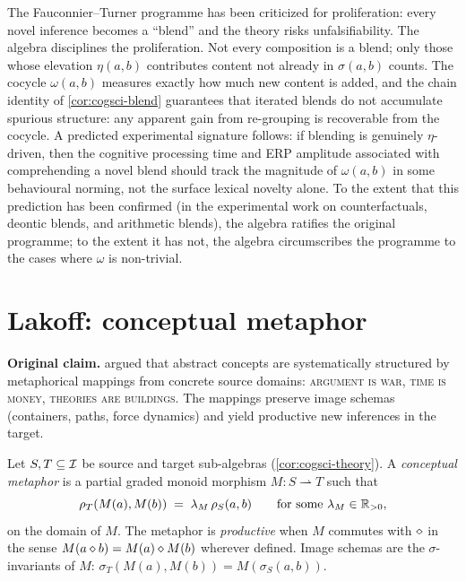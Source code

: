 \litcomment The Fauconnier--Turner programme has been criticized for
proliferation: every novel inference becomes a ``blend'' and the theory
risks unfalsifiability. The algebra disciplines the proliferation. Not
every composition is a blend; only those whose elevation $\eta(a,b)$
contributes content not already in $\sigma(a,b)$ counts. The cocycle
$\omega(a,b)$ measures exactly how much new content is added, and the
chain identity of \cref{cor:cogsci-blend} guarantees that iterated blends
do not accumulate spurious structure: any apparent gain from re-grouping
is recoverable from the cocycle. A predicted experimental signature
follows: if blending is genuinely $\eta$-driven, then the cognitive
processing time and ERP amplitude associated with comprehending a
novel blend should track the magnitude of $\omega(a,b)$ in some
behavioural norming, not the surface lexical novelty alone. To the
extent that this prediction has been confirmed (in the experimental
work on counterfactuals, deontic blends, and arithmetic blends), the
algebra ratifies the original programme; to the extent it has not, the
algebra circumscribes the programme to the cases where $\omega$ is
non-trivial.

\section{Lakoff: conceptual metaphor}\label{sec:cogsci-lakoff}

\textbf{Original claim.} \citet{LakoffJohnson1980} argued that abstract
concepts are systematically structured by metaphorical mappings from
concrete source domains: \textsc{argument is war}, \textsc{time is
money}, \textsc{theories are buildings}. The mappings preserve image
schemas (containers, paths, force dynamics) and yield productive new
inferences in the target.

\formalclaim Let $S,T\subseteq\mathcal{I}$ be source and target sub-algebras
(\cref{cor:cogsci-theory}). A \emph{conceptual metaphor} is a partial
graded monoid morphism $M:S\rightharpoonup T$ such that
\begin{equation}\label{eq:cogsci-lakoff-rho}
  \rho_T(M(a),M(b))\;=\;\lambda_M\,\rho_S(a,b)
  \qquad\text{for some }\lambda_M\in\mathbb{R}_{>0},
\end{equation}
on the domain of $M$. The metaphor is \emph{productive} when $M$ commutes
with $\mathbin{\diamond}$ in the sense $M(a\mathbin{\diamond} b)=M(a)\mathbin{\diamond} M(b)$ wherever
defined. Image schemas are the $\sigma$-invariants of $M$:
$\sigma_T(M(a),M(b)) = M(\sigma_S(a,b))$.

